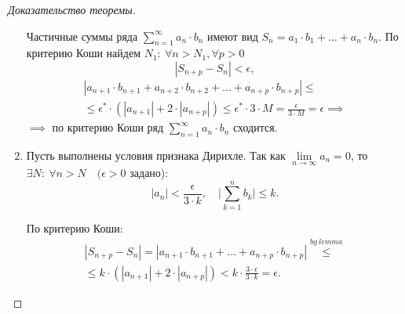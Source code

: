 \documentclass{report}
\theoremstyle{definition}
\begin{document}
\begin{proof}[Доказательство теоремы]
\begin{enumerate}
    Частичные суммы ряда $\sum_{n=1}^{\infty}a_n\cdot b_n$ имеют вид $S_n = a_1\cdot b_1 + \ldots + a_n \cdot b_n$. По критерию Коши найдем $N_1: \ \forall n > N_1, \forall p > 0$
    \begin{equation*}
      |S_{n+p} - S_n| < \epsilon,
    \end{equation*}
    \begin{multline*}
      |a_{n+1} \cdot b_{n+1} + a_{n+2} \cdot b_{n+2} + \ldots + a_{n+p} \cdot b_{n+p}| \leqslant \\
      \leqslant \epsilon^* \cdot (|a_{n+1}| + 2 \cdot |a_{n+p}|) \leqslant \epsilon^* \cdot 3 \cdot M = \frac{\epsilon}{3 \cdot M} = \epsilon \implies
    \end{multline*}
    $\implies$ по критерию Коши ряд $\sum_{n=1}^{\infty}a_n \cdot b_n$ сходится.

    \item Пусть выполнены условия признака Дирихле. Так как $\underset{n\rightarrow\infty}{\lim}a_n = 0$, то $\exists N: \ \forall n > N \quad (\epsilon > 0$ задано):
    \begin{equation*}
      |a_n| < \frac{\epsilon}{3 \cdot k}, \quad \bigg|\sum_{k=1}^{n}b_k\bigg| \leqslant k.
    \end{equation*}

    По критерию Коши:
    \begin{multline*}
      |S_{n+p} - S_n| = |a_{n+1} \cdot b_{n+1} + \ldots + a_{n+p} \cdot b_{n+p}| \overset{by \ lemma}{\leqslant} \\
      \leqslant k\cdot(|a_{n+1}| + 2\cdot |a_{n+p}|) < k\cdot \frac{3\cdot \epsilon}{3 \cdot k} = \epsilon.
    \end{multline*}
  \end{enumerate}
\end{proof}
\end{document}
